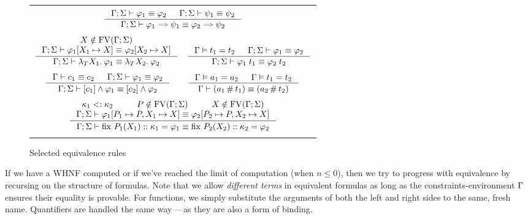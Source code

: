 \documentclass[english, mgr]{iithesis}
\renewcommand{\it}[1]{\textit{#1}}
\newcommand{\fix}[3]{\ensuremath{\text{fix }#1(#2)\ofkind#3=}}\newcommand{\myatop}[2]{\ensuremath{\genfrac{}{}{0pt}{}{#1\hfill}{#2\hfill}}}
\newcommand{\mdash}{\,---\,}
\def\-{{\mdash}}
\begin{document}
\pagebreak

\begin{figure}[htbp]
  \centering
\begin{tabularx}{\textwidth}{|C|}
\hline \\ $
  \inference{
    \jgmnt[\Gamma; \Sigma]{\formphi_1 \equiv \formphi_2 } &
    \jgmnt[\Gamma; \Sigma]{\psi_1 \equiv \psi_2 }
    }{
    \jgmnt[\Gamma; \Sigma]{\formphi_1 \fImp \psi_1 \equiv \formphi_2 \fImp \psi_2 }
  }
$ \\ \\ $
  \inference{
    \termv \notin \fv[\Gamma; \Sigma] \\
    \jgmnt[\Gamma; \Sigma]{\formphi_1[\termv_1 \mapsto \termv] \equiv \formphi_2[\termv_2 \mapsto \termv] }
    }{
    \jgmnt[\Gamma; \Sigma]{\fLamTerm{\termv_1}\formphi_1 \equiv \fLamTerm{\termv_2}\formphi_2 }
  }
  \quad
  \inference{
    \cjgmnt[\Gamma]{\term_1 \ceq \term_2} &
    \jgmnt[\Gamma; \Sigma]{\formphi_1 \equiv \formphi_2 }
    }{
    \jgmnt[\Gamma; \Sigma]{\formphi_1 \fAppTerm \term_1 \equiv \formphi_2 \fAppTerm \term_2 }
  }
$ \\ \\ $
  \inference{
    \jgmnt[\Gamma]{\constr_1 \equiv \constr_2 } &
    \jgmnt[\Gamma; \Sigma]{\formphi_1 \equiv \formphi_2 }
  }{
    \jgmnt[\Gamma; \Sigma]{\fCAnd{\constr_1}\formphi_1 \equiv \fCAnd{\constr_2}\formphi_2 }
  }
\qquad
  \inference{
    \cjgmnt[\Gamma]{\atomv_1 \ceq \atomv_2 } & \cjgmnt[\Gamma]{\term_1 \ceq \term_2 }
  }{
    \jgmnt[\Gamma]{(\atomv_1 \cfresh \term_1) \equiv (\atomv_2 \cfresh \term_2) }
  }
$ \\ \\ $
  \inference{
    \kind_1 \subkind \kind_2 &
    P \notin \fv[\Gamma; \Sigma] & \termv \notin \fv[\Gamma; \Sigma] \\
    \jgmnt[\Gamma; \Sigma]{\formphi_1[P_1 \mapsto P, \termv_1 \mapsto \termv] \equiv \formphi_2[P_2 \mapsto P, \termv_2 \mapsto \termv] }
    }{
    \jgmnt[\Gamma; \Sigma]{\fix{P_1}{\termv_1}{\kind_1}\formphi_1 \equiv \fix{P_2}{\termv_2}{\kind_2}\formphi_2}
  }
$ \\ \\ \hline
\end{tabularx}
  \caption{Selected equivalence rules}
  \label{fig:compute}
\end{figure}
If we have a WHNF computed or if we've reached the limit of computation (when $ n \leqslant 0$),
then we try to progress with equivalence by recursing on the structure of formulas.
Note that we allow \it{different terms} in equivalent formulas as long as the constraints-environment $\Gamma$ ensures their equality is provable.
For functions, we simply substitute the arguments of both the left and right sides to the same, fresh name.
Quantifiers are handled the same way\-as they are also a form of binding.
\end{document}
